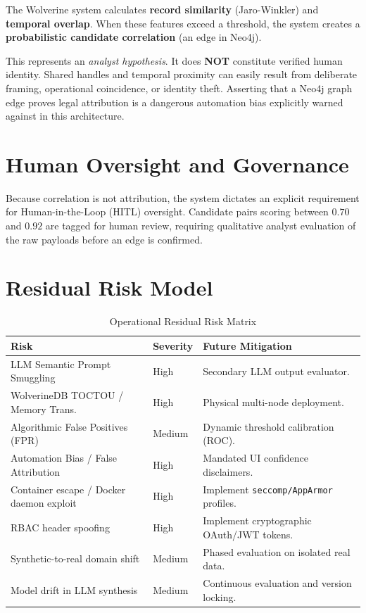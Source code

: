 The Wolverine system calculates \textbf{record similarity} (Jaro-Winkler) and \textbf{temporal overlap}. When these 
features exceed a threshold, the system creates a \textbf{probabilistic candidate correlation} (an edge in Neo4j). 

This represents an \textit{analyst hypothesis}. It does \textbf{NOT} constitute verified human identity. Shared handles 
and temporal proximity can easily result from deliberate framing, operational coincidence, or identity theft. Asserting 
that a Neo4j graph edge proves legal attribution is a dangerous automation bias explicitly warned against in this 
architecture.

\section{Human Oversight and Governance}
\label{sec:sec-governance}
Because correlation is not attribution, the system dictates an explicit requirement for Human-in-the-Loop (HITL) 
oversight. 
Candidate pairs scoring between $0.70$ and $0.92$ are tagged for human review, requiring qualitative analyst evaluation 
of the raw payloads before an edge is confirmed.

\section{Residual Risk Model}
\label{sec:sec-residual-risk}
\begin{table}[htpb]
\centering
\begin{tabular}{p{} p{} p{}}
\toprule
\textbf{Risk} & \textbf{Severity} & \textbf{Future Mitigation} \\
\midrule
LLM Semantic Prompt Smuggling & High & Secondary LLM output evaluator. \\
WolverineDB TOCTOU / Memory Trans. & High & Physical multi-node deployment. \\
Algorithmic False Positives (FPR) & Medium & Dynamic threshold calibration (ROC). \\
Automation Bias / False Attribution & High & Mandated UI confidence disclaimers. \\
Container escape / Docker daemon exploit & High & Implement \texttt{seccomp/AppArmor} profiles. \\
RBAC header spoofing & High & Implement cryptographic OAuth/JWT tokens. \\
Synthetic-to-real domain shift & Medium & Phased evaluation on isolated real data. \\
Model drift in LLM synthesis & Medium & Continuous evaluation and version locking. \\
\bottomrule
\end{tabular}
\caption{Operational Residual Risk Matrix}
\label{tab:residual-risk}
\end{table}

